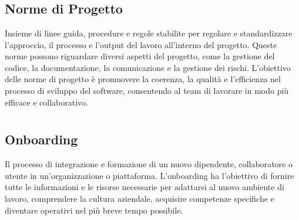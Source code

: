 \section{}

\subsection*{Norme di Progetto}
Insieme di linee guida, procedure e regole stabilite per regolare e standardizzare l’approccio, il processo e l’output del lavoro all’interno del progetto. 
Queste norme possono riguardare diversi aspetti del progetto, come la gestione del codice, la documentazione, la comunicazione e la gestione dei rischi. 
L’obiettivo delle norme di progetto è promuovere la coerenza, la qualità e l’efficienza nel processo di sviluppo del software, consentendo al team di 
lavorare in modo più efficace e collaborativo.

\newpage



\section{}

\hypertarget{sec:onboarding}{}
\subsection*{Onboarding}
Il processo di integrazione e formazione di un nuovo dipendente, collaboratore o utente in un'organizzazione o piattaforma. L'onboarding ha l'obiettivo di 
fornire tutte le informazioni e le risorse necessarie per adattarsi al nuovo ambiente di lavoro, comprendere la cultura aziendale, acquisire competenze 
specifiche e diventare operativi nel più breve tempo possibile. 


\newpage